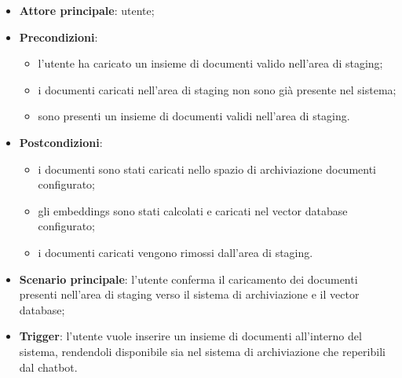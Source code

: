 \documentclass[10pt, a4paper]{article}
\begin{document}
    \begin{itemize}
        \item \textbf{Attore principale}: utente;
        \item \textbf{Precondizioni}:
            \begin{itemize}
                \item l’utente ha caricato un insieme di documenti valido nell’area di staging;
                \item i documenti caricati nell'area di staging non sono già presente nel sistema;
                \item sono presenti un insieme di documenti validi nell’area di staging.
            \end{itemize}
        \item \textbf{Postcondizioni}:
        \begin{itemize}
            \item i documenti sono stati caricati nello spazio di archiviazione documenti configurato;
            \item gli embeddings sono stati calcolati e caricati nel vector database configurato;
            \item i documenti caricati vengono rimossi dall’area di staging.
        \end{itemize}
        \item \textbf{Scenario principale}: l’utente conferma il caricamento dei documenti presenti nell’area di staging verso il sistema di archiviazione e il vector database;
        \item \textbf{Trigger}: l’utente vuole inserire un insieme di documenti all’interno del sistema, rendendoli disponibile sia nel sistema di archiviazione che reperibili dal chatbot.
    \end{itemize}
\end{document}

